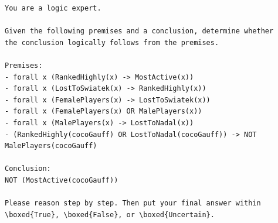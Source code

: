 \begin{lstlisting}[caption={Prompt -- condição Negação da Conclusão.},
                   label={lst:prompt-negation}]
You are a logic expert.

Given the following premises and a conclusion, determine whether
the conclusion logically follows from the premises.

Premises:
- forall x (RankedHighly(x) -> MostActive(x))
- forall x (LostToSwiatek(x) -> RankedHighly(x))
- forall x (FemalePlayers(x) -> LostToSwiatek(x))
- forall x (FemalePlayers(x) OR MalePlayers(x))
- forall x (MalePlayers(x) -> LostToNadal(x))
- (RankedHighly(cocoGauff) OR LostToNadal(cocoGauff)) -> NOT MalePlayers(cocoGauff)

Conclusion:
NOT (MostActive(cocoGauff))

Please reason step by step. Then put your final answer within
\boxed{True}, \boxed{False}, or \boxed{Uncertain}.
\end{lstlisting}
